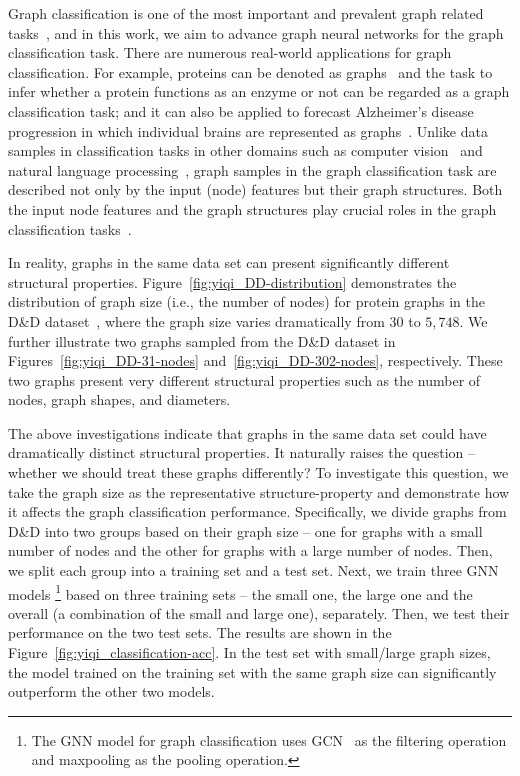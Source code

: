 \documentclass[11pt,dvipdfm]{article}
\begin{document}
Graph classification is one of the most important and prevalent graph related tasks~\cite{errica2019fair}, and in this work, we aim to advance graph neural networks for the graph classification task. 
There are numerous real-world applications for graph classification. 
For example, proteins can be denoted as graphs~\cite{dobson2003distinguishing} and the task to infer whether a protein functions as an enzyme or not can be regarded as a graph classification task; 
and it can also be applied to forecast Alzheimer's disease progression in which individual brains are represented as graphs~\cite{song2019graph}. 
Unlike data samples in classification tasks in other domains such as computer vision~\cite{rawat2017deep} and natural language processing~\cite{kowsari2019text}, graph samples in the graph classification task are described not only  by the input (node) features but their graph structures. Both the input node features and the graph structures play crucial roles in the graph classification tasks~\cite{ying2018hierarchical,ma2019graph,gao2021topology}.

In reality, graphs in the same data set can present significantly different structural properties.
Figure~\ref{fig:yiqi_DD-distribution} demonstrates the distribution of graph size (i.e., the number of nodes) for protein graphs in the D\&D dataset~\cite{dobson2003distinguishing}, where the graph size varies dramatically from $30$ to $5,748$.
We further illustrate two graphs sampled from the D\&D dataset in Figures~\ref{fig:yiqi_DD-31-nodes} and~\ref{fig:yiqi_DD-302-nodes}, respectively. 
These two graphs present very different structural properties such as the number of nodes, graph shapes, and diameters.


The above investigations indicate that graphs in the same data set could have dramatically distinct structural properties. 
It naturally raises the question -- whether we should treat these graphs differently? 
To investigate this question, we take the graph size as the representative structure-property and demonstrate how it affects the graph classification performance. Specifically, we divide graphs from D\&D into two groups based on their graph size -- one for graphs with a small number of nodes and the other for graphs with a large number of nodes. Then, we split each group into a training set and a test set. Next, we train three GNN models \footnote {The GNN model for graph classification uses GCN~\cite{kipf2016semi} as the filtering operation and maxpooling as the pooling operation.} based on three training sets -- the small one, the large one and the overall (a combination of the small and large one), separately. Then, we test their performance on the two test sets. The results are shown in the Figure~\ref{fig:yiqi_classification-acc}. 
In the test set with small/large graph sizes, the model trained on the training set with the same graph size can significantly outperform the other two models. 
\end{document}
